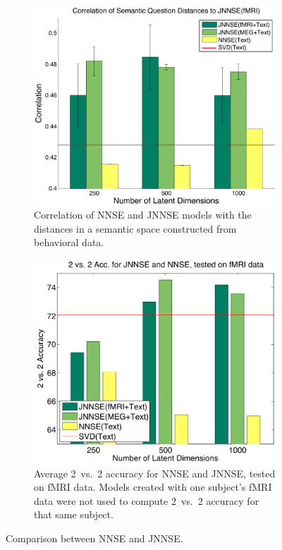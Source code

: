 \begin{figure}[!ht]
    \centering
    \captionsetup{width=.8\linewidth}
    \begin{subfigure}{.49\textwidth}
        \centering
        \captionsetup{width=.8\linewidth}
        \includegraphics[width=.7\linewidth]{images/jnnse.png}
        \caption{Correlation of NNSE and JNNSE models with the distances in a semantic space constructed from behavioral data.}
        \label{fig:jnnse}
    \end{subfigure}
    \begin{subfigure}{.49\textwidth}
        \centering
        \captionsetup{width=.8\linewidth}
        \includegraphics[width=.65\linewidth]{images/jnnse_2.png}
        \caption{Average 2~vs.~2 accuracy for NNSE and JNNSE, tested on fMRI data. Models created with one subject’s fMRI data were not used to compute 2~vs.~2 accuracy for that same subject.}
        \label{fig:jnnse_2}
    \end{subfigure}
    \caption{Comparison between NNSE and JNNSE.}
    \label{fig:jnnse_comp}
\end{figure}

